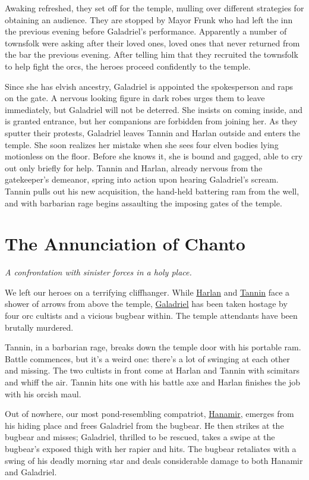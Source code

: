 \documentclass[smalldemyvopaper,11pt,twoside,onecolumn,openright,extrafontsizes]{memoir}
\newcommand{\chapdesc}[1]{
    \begin{flushright}
    \emph{{#1}}
    \end{flushright}
    \vspace{26pt}
}
\begin{document}
Awaking refreshed, they set off for the temple, mulling over different
strategies for obtaining an audience. They are stopped by Mayor Frunk
who had left the inn the previous evening before Galadriel's
performance. Apparently a number of townsfolk were asking after their
loved ones, loved ones that never returned from the bar the previous
evening. After telling him that they recruited the townsfolk to help
fight the orcs, the heroes proceed confidently to the temple.

Since she has elvish ancestry, Galadriel is appointed the spokesperson
and raps on the gate. A nervous looking figure in dark robes urges them
to leave immediately, but Galadriel will not be deterred. She insists on
coming inside, and is granted entrance, but her companions are forbidden
from joining her. As they sputter their protests, Galadriel leaves
Tannin and Harlan outside and enters the temple. She soon realizes her
mistake when she sees four elven bodies lying motionless on the floor.
Before she knows it, she is bound and gagged, able to cry out only
briefly for help. Tannin and Harlan, already nervous from the
gatekeeper's demeanor, spring into action upon hearing Galadriel's
scream. Tannin pulls out his new acquisition, the hand-held battering
ram from the well, and with barbarian rage begins assaulting the
imposing gates of the temple.


\chapter{The Annunciation of Chanto}
\chapdesc{A confrontation with sinister forces in a holy place.}

We left our heroes on a terrifying cliffhanger. While
\href{/characters/harlan/}{Harlan} and
\href{/characters/tannin/}{Tannin} face a shower of arrows from above
the temple, \href{/characters/galadriel/}{Galadriel} has been taken
hostage by four orc cultists and a vicious bugbear within. The temple
attendants have been brutally murdered.

Tannin, in a barbarian rage, breaks down the temple door with his
portable ram. Battle commences, but it's a weird one: there's a lot of
swinging at each other and missing. The two cultists in front come at
Harlan and Tannin with scimitars and whiff the air. Tannin hits one with
his battle axe and Harlan finishes the job with his orcish maul.

Out of nowhere, our most pond-resembling compatriot,
\href{/characters/hanamir/}{Hanamir}, emerges from his hiding place and
frees Galadriel from the bugbear. He then strikes at the bugbear and
misses; Galadriel, thrilled to be rescued, takes a swipe at the
bugbear's exposed thigh with her rapier and hits. The bugbear retaliates
with a swing of his deadly morning star and deals considerable damage to
both Hanamir and Galadriel.
\end{document}
